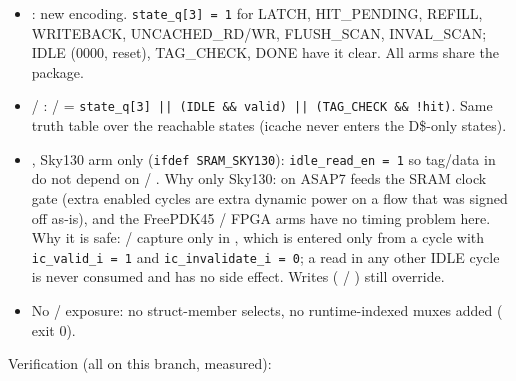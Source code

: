 \begin{record}

\begin{itemize}
\tightlist
\item
  : new  encoding.
  \texttt{state\_\allowbreak{}q[3]\ =\allowbreak{}\ 1} for LATCH,
  HIT\_\allowbreak{}PENDING, REFILL, WRITEBACK,
  UNCACHED\_\allowbreak{}RD/\allowbreak{}WR, FLUSH\_\allowbreak{}SCAN,
  INVAL\_\allowbreak{}SCAN; IDLE (0000, reset), TAG\_\allowbreak{}CHECK,
  DONE have it clear. All arms share the package.
\item
   / :  /
   =
  \texttt{state\_\allowbreak{}q[3]\ ||\ (IDLE\ \&\&\ valid)\ ||\ (TAG\_\allowbreak{}CHECK\ \&\&\ !hit)}.
  Same truth table over the reachable states (icache never enters the
  D\$-only states).
\item
  , Sky130 arm only
  (\texttt{ifdef\ SRAM\_\allowbreak{}SKY130}):
  \texttt{idle\_\allowbreak{}read\_\allowbreak{}en\ =\allowbreak{}\ 1}
  so tag/data  in  do not depend on
   / . Why only Sky130: on ASAP7
   feeds the SRAM clock gate (extra enabled cycles are extra
  dynamic power on a flow that was signed off as-is), and the FreePDK45
  / FPGA arms have no timing problem here. Why it is safe:
   /  capture  only in
  , which is entered only from a 
  cycle with
  \texttt{ic\_\allowbreak{}valid\_\allowbreak{}i\ =\allowbreak{}\ 1} and
  \texttt{ic\_\allowbreak{}invalidate\_\allowbreak{}i\ =\allowbreak{}\ 0};
  a read in any other IDLE cycle is never consumed and has no side
  effect. Writes ( / ) still override.
\item
  No  /  exposure: no struct-member selects, no
  runtime-indexed muxes added ( exit
  0).
\end{itemize}

Verification (all on this branch, measured):

{\footnotesize\setlength{\tabcolsep}{3pt}

}
\end{record}

